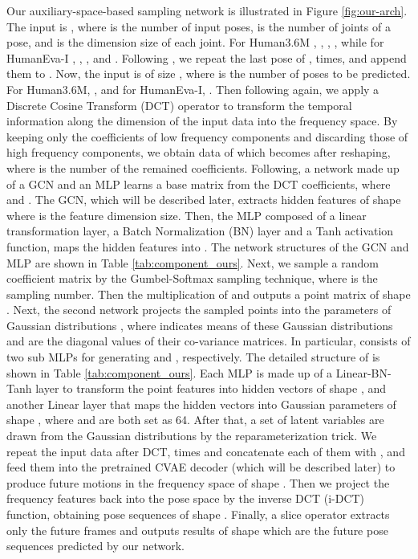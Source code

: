 \documentclass[sigconf,screen,nonacm]{acmart}
\begin{document}
	
	Our auxiliary-space-based sampling network is illustrated in Figure \ref{fig:our-arch}. The input is , where  is the number of input poses,  is the number of joints of a pose, and  is the dimension size of each joint. For Human3.6M \cite{ionescu2013human3}, , , , while for HumanEva-I \cite{sigal2010humaneva}, , , and .
	Following \cite{mao2019learning}, we repeat the last pose of ,  times, and append them to . Now, the input is of size , where  is the number of poses to be predicted. 
For Human3.6M, , and for HumanEva-I, .
	Then following \cite{mao2019learning} again, we apply a Discrete Cosine Transform (DCT) operator to
transform the temporal information along the  dimension of the input data into the frequency space. By keeping only the coefficients of low frequency components and discarding those of high frequency components, we obtain data of  which becomes  after reshaping, where  is the number of the remained coefficients.
	Following, a network  made up of a GCN and an MLP learns a base matrix  from the DCT coefficients, where  and .
The GCN, which will be described later, extracts hidden features of shape  where  is the feature dimension size. Then, the MLP composed of a linear transformation layer, a Batch Normalization (BN) layer and a Tanh activation function, maps the hidden features into . The network structures of the GCN and MLP are shown in Table \ref{tab:component_ours}.
	Next, we sample a random coefficient matrix  by the Gumbel-Softmax sampling technique, where  is the sampling number. Then the multiplication of  and  outputs a point matrix of shape .
	Next, the second network  projects the  sampled points into the parameters of  Gaussian distributions , where  indicates means of these Gaussian distributions and  are the diagonal values of their co-variance matrices.
	In particular,  consists of two sub MLPs for generating  and , respectively. The detailed structure of  is shown in Table \ref{tab:component_ours}. Each MLP is made up of a Linear-BN-Tanh layer to transform the point features into hidden vectors of shape , and another Linear layer that maps the hidden vectors into Gaussian parameters of shape , where  and  are both set as 64.
	After that, a set of latent variables  are drawn from the Gaussian distributions by the reparameterization trick.
	We repeat the input data after DCT,  times and concatenate each of them with , and feed them into the pretrained CVAE decoder (which will be described later) to produce future motions in the frequency space of shape . Then we project the frequency features back into the pose space by the inverse DCT (i-DCT) function, obtaining  pose sequences of shape .
	Finally, a slice operator extracts only the future  frames and outputs results of shape  which are the  future pose sequences predicted by our network.
	
\end{document}
